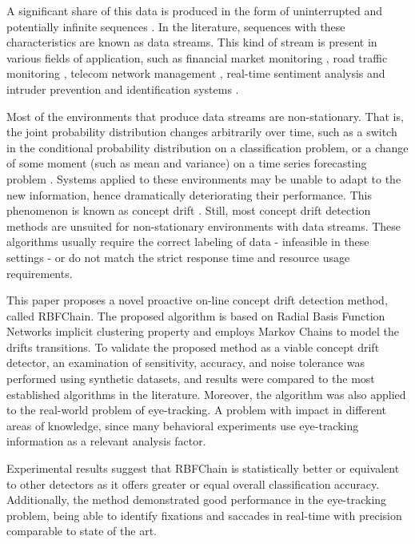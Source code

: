 \documentclass[preprint,12pt]{elsarticle}
\begin{document}
A significant share of this data is produced in the form of uninterrupted and potentially infinite sequences \cite{Aggarwal:2006:DSM:1196418}.
In the literature,
sequences with these characteristics are known as data streams.
This kind of stream is present in various fields of application,
such as financial market monitoring  \cite{ZHOU:2015},
road traffic monitoring \cite{Wang:2015:EOV:2843092.2843464},
telecom network management \cite{delattre2015method},
real-time sentiment analysis  \cite{KRANJC2015187}
and intruder prevention and identification systems \cite{KENKRE:PAI:COLACO:2015}.

Most of the environments that produce data streams are non-stationary.
That is,
the joint probability distribution changes arbitrarily over time,
such as a switch in the conditional probability distribution on a classification problem,
or a change of some moment (such as mean and variance) on a time series forecasting problem \cite{tsymbal2004problem}.
Systems applied to these environments may be unable to adapt to the new information, hence dramatically deteriorating their performance.
This phenomenon is known as concept drift \cite{Gama:2014:DAF:2670967.2670971}.
%
Still, most concept drift detection methods are unsuited for non-stationary environments with data streams.
These algorithms usually require the correct labeling of data - infeasible in these settings -
 or do not match the strict response time and resource usage requirements.

This paper proposes a novel proactive on-line concept drift detection method, called RBFChain.
The proposed algorithm is based on Radial Basis Function Networks implicit clustering property
and employs Markov Chains to model the drifts transitions.
To validate the proposed method as a viable concept drift detector,
an examination of sensitivity, accuracy,
and noise tolerance was performed using synthetic datasets,
and results were compared to the most established algorithms in the literature.
%
Moreover, the algorithm was also applied to the real-world problem of eye-tracking.
A problem with impact in different areas of knowledge, since many behavioral experiments use eye-tracking information as a relevant analysis factor.

Experimental results suggest that RBFChain is statistically better or equivalent to other detectors as it offers greater or equal overall classification accuracy.
Additionally, the method demonstrated good performance in the eye-tracking problem,
being able to identify fixations and saccades in real-time with precision comparable to state of the art.
\end{document}
